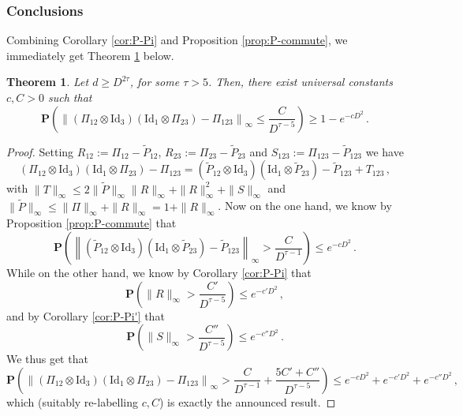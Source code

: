 \documentclass{amsart}
\newtheorem{theorem}{Theorem}[section]
\renewcommand{\P}{\mathbf{P}}
\renewcommand{\leq}{\leqslant}
\renewcommand{\geq}{\geqslant}
\newcommand{\Id}{\mathrm{Id}}
\begin{document}
\subsubsection{Conclusions} \hfill\par\smallskip

Combining Corollary \ref{cor:P-Pi} and Proposition \ref{prop:P-commute}, we immediately get Theorem \ref{th:Pi-commute} below.

\begin{theorem} \label{th:Pi-commute}
    Let $d\geq D^{2\tau}$, for some $\tau>5$. Then, there exist universal constants $c,C>0$ such that
    \[ \P\left( \left\| \left(\Pi_{12}\otimes\Id_3\right) \left(\Id_1\otimes\Pi_{23}\right)-\Pi_{123} \right\|_{\infty} \leq \frac{C}{D^{\tau-5}} \right) \geq 1-e^{-cD^2} \, . \]
\end{theorem}

\begin{proof}
    Setting $R_{12}:=\Pi_{12}-\widetilde{P}_{12}$, $R_{23}:=\Pi_{23}-\widetilde{P}_{23}$ and $S_{123}:=\Pi_{123}-\widetilde{P}_{123}$ we have
    \[  \left(\Pi_{12}\otimes\Id_3\right) \left(\Id_1\otimes\Pi_{23}\right)-\Pi_{123} = \left(\widetilde{P}_{12}\otimes\Id_3\right) \left(\Id_1\otimes\widetilde{P}_{23}\right)-\widetilde{P}_{123} + T_{123} \, , \] %
    with $\|T\|_{\infty} \leq 2\|\widetilde{P}\|_{\infty}\|R\|_{\infty} + \|R\|_{\infty}^2 + \|S\|_\infty$ and $\|\widetilde{P}\|_{\infty}\leq\|\Pi\|_\infty+\|R\|_\infty=1+\|R\|_\infty$. Now on the one hand, we know by Proposition \ref{prop:P-commute} that
    \[  \P\left( \left\| \left(\widetilde{P}_{12}\otimes\Id_3\right) \left(\Id_1\otimes\widetilde{P}_{23}\right)-\widetilde{P}_{123} \right\|_{\infty} > \frac{C}{D^{\tau-1}} \right) \leq e^{-cD^2} \, . \]
    While on the other hand, we know by Corollary \ref{cor:P-Pi} that
    \[ \P\left( \|R\|_{\infty}> \frac{C'}{D^{\tau-5}} \right) \leq e^{-c'D^2} \, , \]
    and by Corollary \ref{cor:P-Pi'} that
    \[ \P\left( \|S\|_{\infty}> \frac{C''}{D^{\tau-5}} \right) \leq e^{-c''D^2} \, . \]
    We thus get that
    \[ \P\left( \left\| \left(\Pi_{12}\otimes\Id_3\right) \left(\Id_1\otimes\Pi_{23}\right)-\Pi_{123} \right\|_{\infty} > \frac{C}{D^{\tau-1}} + \frac{5C'+C''}{D^{\tau-5}} \right) \leq e^{-cD^2} + e^{-c'D^2} + e^{-c''D^2} \, , \]
    which (suitably re-labelling $c,C$) is exactly the announced result.
\end{proof}
\end{document}
